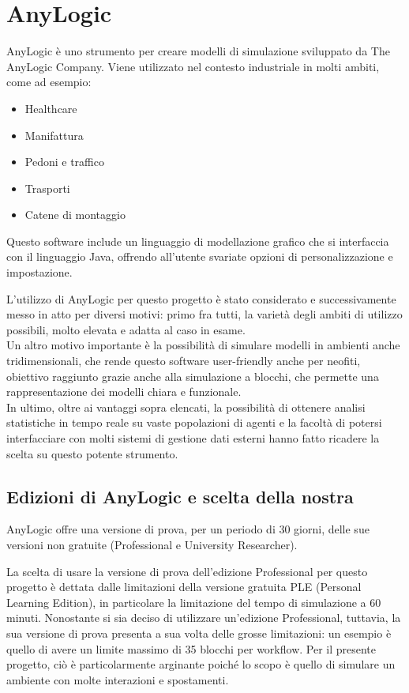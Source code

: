 \chapter{AnyLogic}
AnyLogic è uno strumento per creare modelli di simulazione sviluppato da The AnyLogic Company.
Viene utilizzato nel contesto industriale in molti ambiti, come ad esempio: 
\begin{itemize}
    \item Healthcare
    \item Manifattura
    \item Pedoni e traffico
    \item Trasporti
    \item Catene di montaggio
\end{itemize}


Questo software include un linguaggio di modellazione grafico che si interfaccia con il linguaggio Java, offrendo all’utente svariate opzioni di personalizzazione e impostazione. 

L'utilizzo di AnyLogic per questo progetto è stato considerato e successivamente messo in atto per diversi motivi: primo fra tutti, la varietà degli ambiti di utilizzo possibili, molto elevata e adatta al caso in esame. \\
Un altro motivo importante è la possibilità di simulare modelli in ambienti anche tridimensionali, che rende questo software user-friendly anche per neofiti, obiettivo raggiunto grazie anche alla simulazione a blocchi, che permette una rappresentazione dei modelli chiara e funzionale. 
\\ In ultimo, oltre ai vantaggi sopra elencati, la possibilità di ottenere analisi statistiche in tempo reale su vaste popolazioni di agenti e la facoltà di potersi interfacciare con molti sistemi di gestione dati esterni hanno fatto ricadere la scelta su questo potente strumento. 


\section{Edizioni di AnyLogic e scelta della nostra}
AnyLogic offre una versione di prova, per un periodo di 30 giorni, delle sue versioni non gratuite (Professional e University Researcher). 

La scelta di usare la versione di prova dell’edizione Professional per questo progetto è dettata dalle limitazioni della versione gratuita PLE (Personal Learning Edition), in particolare la limitazione del tempo di simulazione a 60 minuti. 
Nonostante si sia deciso di utilizzare un’edizione Professional, tuttavia, la sua versione di prova presenta a sua volta delle grosse limitazioni: un esempio è quello di avere un limite massimo di 35 blocchi per workflow. 
Per il presente progetto, ciò è particolarmente arginante poiché lo scopo è quello di simulare un ambiente con molte interazioni e spostamenti. 


